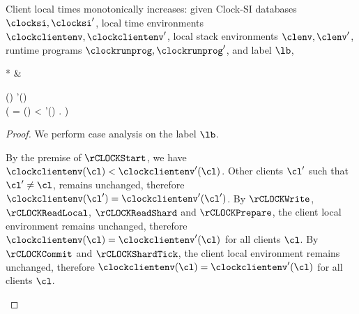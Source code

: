 \begin{toappendix}
\label{sec:proof-client-local-time-mono}
\begin{lemma}
\label{lem:clock-si-local-time-mono}
Client local times monotonically increases:
given Clock-SI databases \( \clocksi, \clocksi'\), local time environments \( \clockclientenv, \clockclientenv' \),
local stack environments \( \clenv, \clenv'\), runtime programs \( \clockrunprog, \clockrunprog' \),
and label \( \lb \),
\begin{Formulae}*
& \begin{Formula}
\land \Forall{\cl \in \Dom(\clockclientenv) | \clockshard \in \Dom(\clocksi) | \clocktime }
    \clockclientenv(\cl) \leq \clockclientenv'(\cl)
\\ {} \land \left( 
    \lb = \lbCLOCKStart{\clocktime} \implies 
    \clockclientenv(\cl) < \clockclientenv'(\cl) .
\right)
\end{Formula}
\end{Formulae}
\end{lemma}
\begin{proof}
We perform case analysis on the label \( \lb \).
\begin{enumerate}
\Case{\( \lb = \lbCLOCKStart{\clocktime} \)}
    By the premise of \( \rCLOCKStart \), we have 
    \( \clockclientenv(\cl) < \clockclientenv'(\cl) \).
    Other clients \( \cl' \) such that \( \cl' \neq \cl \), remains unchanged,
    therefore \( \clockclientenv(\cl') = \clockclientenv'(\cl') \).
    By \( \rCLOCKWrite \), \( \rCLOCKReadLocal \), \( \rCLOCKReadShard \) and \( \rCLOCKPrepare\), 
    the client local environment remains unchanged,
    therefore \( \clockclientenv(\cl) = \clockclientenv'(\cl) \) for all clients \( \cl \).
    By \( \rCLOCKCommit \) and \( \rCLOCKShardTick \), 
    the client local environment remains unchanged,
    therefore \( \clockclientenv(\cl) = \clockclientenv'(\cl) \) for all clients \( \cl \). \qedhere
\end{enumerate}
\end{proof}
\end{toappendix}

